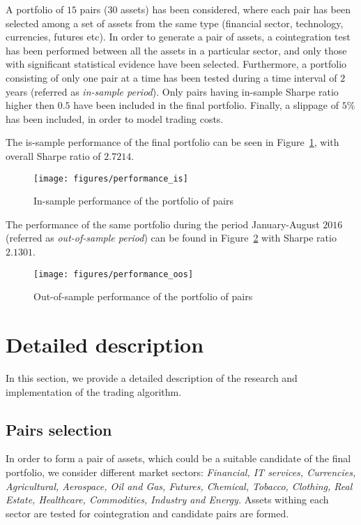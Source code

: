 \documentclass{paper}
\begin{document}
A portfolio of $15$ pairs ($30$ assets) has been considered, where each pair has been selected among a set of assets from the same type (financial sector, technology, currencies, futures etc). In order to generate a pair of assets, a cointegration test has been performed between all the assets in a particular sector, and only those with significant statistical evidence have been selected. Furthermore, a portfolio consisting of only one pair at a time has been tested during a time interval of $2$ years (referred as \textit{in-sample period}). Only pairs having in-sample Sharpe ratio higher then $0.5$ have been included in the final portfolio. Finally, a slippage of $5\%$ has been included, in order to model trading costs.

The is-sample performance of the final portfolio can be seen in Figure~\ref{fig:performance_is}, with overall Sharpe ratio of $2.7214.$ 
\begin{figure}[H]
\centerline{\texttt{[image: figures/performance\_is]}}
\caption{In-sample performance of the portfolio of pairs}
\label{fig:performance_is}
\end{figure}

The performance of the same portfolio during the period January-August $2016$ (referred as \textit{out-of-sample period}) can be found in Figure~\ref{fig:performance_oos} with Sharpe ratio $2.1301$.
\begin{figure}[H]
\centerline{\texttt{[image: figures/performance\_oos]}}
\caption{Out-of-sample performance of the portfolio of pairs}
\label{fig:performance_oos}
\end{figure}


\section{Detailed description}\label{section_detailed_description}

In this section, we provide a detailed description of the research and implementation of the trading algorithm.

\subsection{Pairs selection}

In order to form a pair of assets, which could be a suitable candidate of the final portfolio, we consider different market sectors: \textit{Financial, IT services, Currencies, Agricultural, Aerospace, Oil and Gas, Futures, Chemical, Tobacco, Clothing, Real Estate, Healthcare, Commodities, Industry and Energy.} Assets withing each sector are tested for cointegration and candidate pairs are formed.
\end{document}
